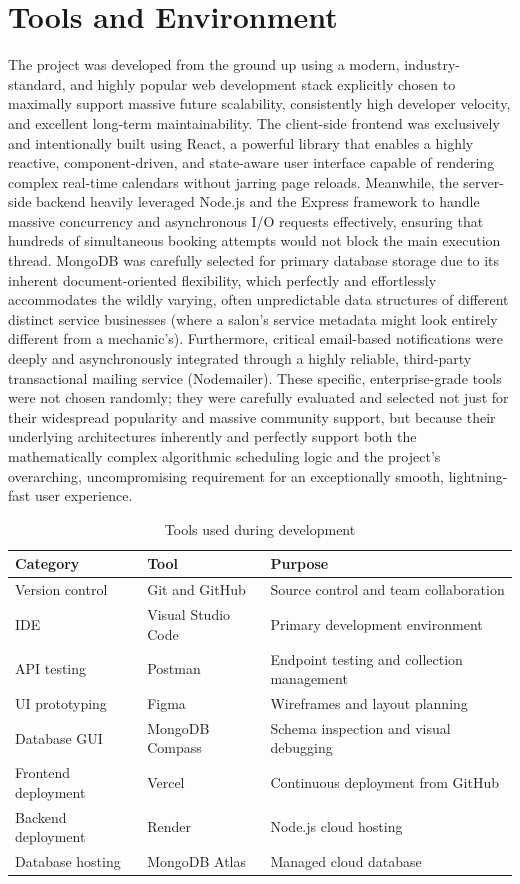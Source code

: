 \section{Tools and Environment}
The project was developed from the ground up using a modern, industry-standard, and highly popular web development stack explicitly chosen to maximally support massive future scalability, consistently high developer velocity, and excellent long-term maintainability. The client-side frontend was exclusively and intentionally built using React, a powerful library that enables a highly reactive, component-driven, and state-aware user interface capable of rendering complex real-time calendars without jarring page reloads. Meanwhile, the server-side backend heavily leveraged Node.js and the Express framework to handle massive concurrency and asynchronous I/O requests effectively, ensuring that hundreds of simultaneous booking attempts would not block the main execution thread. MongoDB was carefully selected for primary database storage due to its inherent document-oriented flexibility, which perfectly and effortlessly accommodates the wildly varying, often unpredictable data structures of different distinct service businesses (where a salon's service metadata might look entirely different from a mechanic's). Furthermore, critical email-based notifications were deeply and asynchronously integrated through a highly reliable, third-party transactional mailing service (Nodemailer). These specific, enterprise-grade tools were not chosen randomly; they were carefully evaluated and selected not just for their widespread popularity and massive community support, but because their underlying architectures inherently and perfectly support both the mathematically complex algorithmic scheduling logic and the project's overarching, uncompromising requirement for an exceptionally smooth, lightning-fast user experience.

\begin{table}[h]
\centering
\caption{Tools used during development}
\begin{tabular}{|p{3.5cm}|p{3.5cm}|p{5cm}|}
\hline
\textbf{Category} & \textbf{Tool} & \textbf{Purpose} \\
\hline
Version control & Git and GitHub & Source control and team collaboration \\
\hline
IDE & Visual Studio Code & Primary development environment \\
\hline
API testing & Postman & Endpoint testing and collection management \\
\hline
UI prototyping & Figma & Wireframes and layout planning \\
\hline
Database GUI & MongoDB Compass & Schema inspection and visual debugging \\
\hline
Frontend deployment & Vercel & Continuous deployment from GitHub \\
\hline
Backend deployment & Render & Node.js cloud hosting \\
\hline
Database hosting & MongoDB Atlas & Managed cloud database \\
\hline
\end{tabular}
\end{table}


